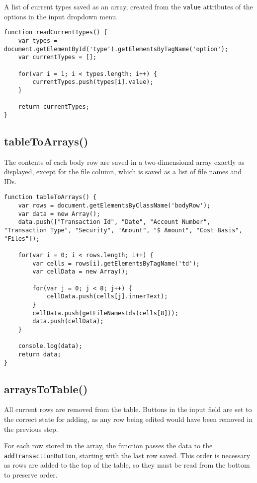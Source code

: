 \documentclass[letterpaper]{article}
\begin{document}
A list of current types saved as an array, created from the \lstinline{value} attributes of the options in the input dropdown menu.

\begin{lstlisting}[firstnumber=734]
function readCurrentTypes() {
    var types = document.getElementById('type').getElementsByTagName('option');
    var currentTypes = [];

    for(var i = 1; i < types.length; i++) {
        currentTypes.push(types[i].value);
    }

    return currentTypes;
}
\end{lstlisting}

\subsection{tableToArrays()}

The contents of each body row are saved in a two-dimensional array exactly as displayed, except for the file column, which is saved as a list of file names and IDs.

\begin{lstlisting}[firstnumber=745]
function tableToArrays() {
    var rows = document.getElementsByClassName('bodyRow');
    var data = new Array();
    data.push(["Transaction Id", "Date", "Account Number", "Transaction Type", "Security", "Amount", "$ Amount", "Cost Basis", "Files"]);

    for(var i = 0; i < rows.length; i++) {
        var cells = rows[i].getElementsByTagName('td');
        var cellData = new Array();

        for(var j = 0; j < 8; j++) {
            cellData.push(cells[j].innerText);
        }
        cellData.push(getFileNamesIds(cells[8]));
        data.push(cellData);
    }

    console.log(data);
    return data;
}
\end{lstlisting}

\subsection{arraysToTable()}

All current rows are removed from the table.
Buttons in the input field are set to the correct state for adding, as any row being edited would have been removed in the previous step.

For each row stored in the array, the function passes the data to the \lstinline{addTransactionButton}, starting with the last row saved.
This order is necessary as rows are added to the top of the table, so they must be read from the bottom to preserve order.
\end{document}
